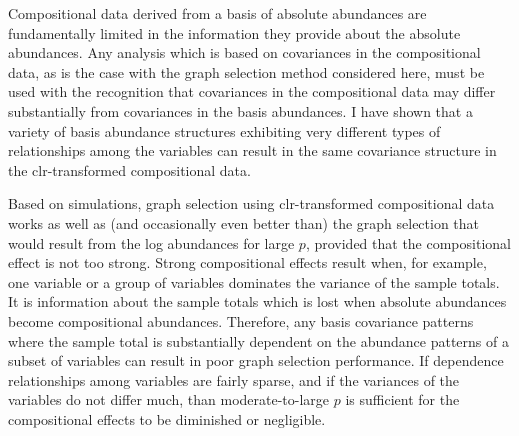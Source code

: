 \documentclass[10pt]{article}
\begin{document}
Compositional data derived from a basis of absolute abundances are fundamentally limited in the information they provide about the absolute abundances. Any analysis which is based on covariances in the compositional data, as is the case with the graph selection method considered here, must be used with the recognition that covariances in the compositional data may differ substantially from covariances in the basis abundances. I have shown that a variety of basis abundance structures exhibiting very different types of relationships among the variables can result in the same covariance structure in the clr-transformed compositional data.

Based on simulations, graph selection using clr-transformed compositional data works as well as (and occasionally even better than) the graph selection that would result from the log abundances for large $p$, provided that the compositional effect is not too strong. Strong compositional effects result when, for example, one variable or a group of variables dominates the variance of the sample totals. It is information about the sample totals which is lost when absolute abundances become compositional abundances. Therefore, any basis covariance patterns where the sample total is substantially dependent on the abundance patterns of a subset of variables can result in poor graph selection performance. If dependence relationships among variables are fairly sparse, and if the variances of the variables do not differ much, than moderate-to-large $p$ is sufficient for the compositional effects to be diminished or negligible.

\pagebreak


\end{document}

